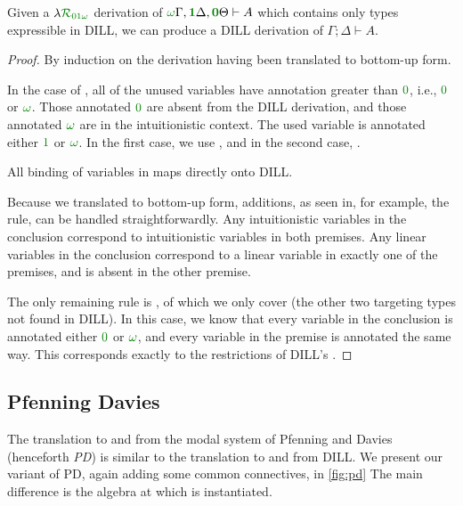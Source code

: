 \documentclass[submission,copyright,creativecommons]{eptcs}
\begin{document}
\begin{proposition}
  Given a $\name_{\instDILL}$ derivation of
  $\ctx{\Gamma}{\vct\unrestricted}, \ctx{\Delta}{\vct\linear},
  \ctx{\Theta}{\vct\zero} \vdash A$ which contains only types expressible
  in DILL, we can produce a DILL derivation of $\Gamma; \Delta \vdash A$.
\end{proposition}
\begin{proof}
  By induction on the derivation having been translated to bottom-up form.

  In the case of , all of the unused variables have annotation
  greater than $\zero$, i.e., $\zero$ or $\unrestricted$.
  Those annotated $\zero$ are absent from the DILL derivation, and those
  annotated $\unrestricted$ are in the intuitionistic context.
  The used variable is annotated either $\linear$ or $\unrestricted$.
  In the first case, we use , and in the second case,
  .

  All binding of variables in \name{} maps directly onto DILL.

  Because we translated to bottom-up form, additions, as seen in, for example,
  the  rule, can be handled straightforwardly.
  Any intuitionistic variables in the conclusion correspond to intuitionistic
  variables in both premises.
  Any linear variables in the conclusion correspond to a linear variable in
  exactly one of the premises, and is absent in the other premise.

  The only remaining rule is , of which we only cover
   (the other two targeting types not found
  in DILL).
  In this case, we know that every variable in the conclusion is annotated
  either $\zero$ or $\unrestricted$, and every variable in the premise is
  annotated the same way.
  This corresponds exactly to the restrictions of DILL's .
\end{proof}

\subsection{Pfenning Davies}\label{sec:pd}

The translation to and from the modal system of Pfenning and Davies
\cite{judgmental} (henceforth \emph{PD}) is similar to the translation to and
from DILL.
We present our variant of PD, again adding some common connectives, in
\autoref{fig:pd}
The main difference is the algebra at which \name{} is instantiated.
\end{document}

